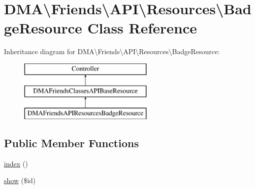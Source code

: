 \hypertarget{classDMA_1_1Friends_1_1API_1_1Resources_1_1BadgeResource}{}\section{D\+M\+A\textbackslash{}Friends\textbackslash{}A\+P\+I\textbackslash{}Resources\textbackslash{}Badge\+Resource Class Reference}
\label{classDMA_1_1Friends_1_1API_1_1Resources_1_1BadgeResource}
Inheritance diagram for D\+M\+A\textbackslash{}Friends\textbackslash{}A\+P\+I\textbackslash{}Resources\textbackslash{}Badge\+Resource\+:\begin{figure}[H]
\begin{center}
\leavevmode
\includegraphics[height=3.000000cm]{d6/dfa/classDMA_1_1Friends_1_1API_1_1Resources_1_1BadgeResource}
\end{center}
\end{figure}
\subsection*{Public Member Functions}
\begin{DoxyCompactItemize}
\item 
\hyperlink{classDMA_1_1Friends_1_1API_1_1Resources_1_1BadgeResource_a6f5ee04349219756b5c8bc212a9725a3}{index} ()
\item 
\hyperlink{classDMA_1_1Friends_1_1API_1_1Resources_1_1BadgeResource_a7a2c5687a2f48d7f33fa6792d02916d3}{show} (\$id)
\end{DoxyCompactItemize}
